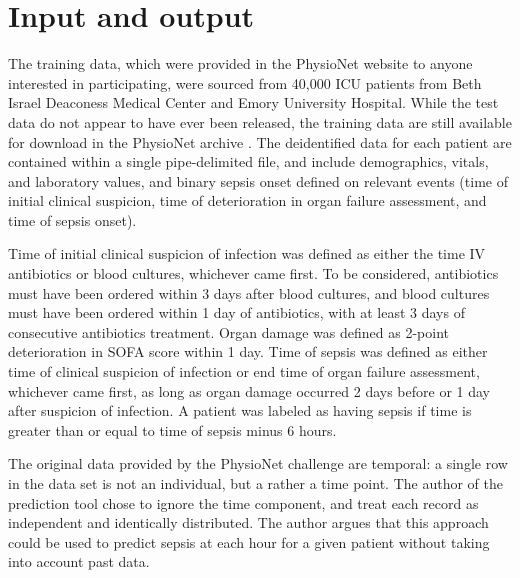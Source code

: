\documentclass[10pt,letterpaper]{article}
\begin{document}
\section*{Input and output}


\par The training data, which were provided in the PhysioNet website to anyone interested in participating, were sourced from 40,000 ICU patients from Beth Israel Deaconess Medical Center and Emory University Hospital. While the test data do not appear to have ever been released, the training data are still available for download in the PhysioNet archive \cite{Goldberger2000}. The deidentified data for each patient are contained within a single pipe-delimited file, and include demographics, vitals, and laboratory values, and binary sepsis onset defined on relevant events (time of initial clinical suspicion, time of deterioration in organ failure assessment, and time of sepsis onset).

\par Time of initial clinical suspicion of infection was defined as either the time IV antibiotics or blood cultures, whichever came first. To be considered, antibiotics must have been ordered within 3 days after blood cultures, and blood cultures must have been ordered within 1 day of antibiotics, with at least 3 days of consecutive antibiotics treatment. Organ damage was defined as 2-point deterioration in SOFA score within 1 day. Time of sepsis was defined as either time of clinical suspicion of infection or end time of organ failure assessment, whichever came first, as long as organ damage occurred 2 days before or 1 day after suspicion of infection. A patient was labeled as having sepsis if time is greater than or equal to time of sepsis minus 6 hours.

\par The original data provided by the PhysioNet challenge are temporal: a single row in the data set is not an individual, but a rather a time point. The author of the prediction tool chose to ignore the time component, and treat each record as independent and identically distributed. The author argues that this approach could be used to predict sepsis at each hour for a given patient without taking into account past data.
\end{document}
